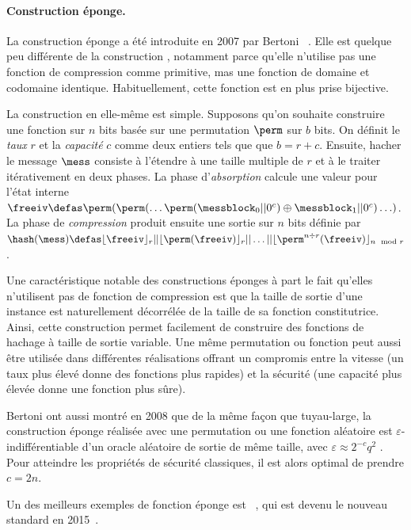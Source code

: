 \paragraph{Construction éponge.} La construction éponge a été introduite en 2007 par
Bertoni \etal~\cite{SpongeFunctions}.
Elle est quelque peu différente de la construction \merkdam, notamment parce qu'elle n'utilise pas une fonction de compression
comme primitive, mas une fonction de domaine et codomaine identique. Habituellement, cette fonction est en plus prise bijective.

La construction en elle-même est simple. Supposons qu'on souhaite construire une fonction sur $n$ bits basée sur une permutation $\perm$ sur $b$ bits.
On définit le \emph{taux} $r$ et la \emph{capacité} $c$ comme deux entiers tels que que $b = r + c$.
Ensuite, hacher le message
$\mess$ consiste à
l'étendre à une taille multiple de $r$ et à le traiter itérativement en deux phases.
La phase d'\emph{absorption} calcule une valeur pour l'état interne
$\freeiv \defas \perm(\perm(\ldots\perm(\messblock_0||0^c)\oplus\messblock_1||0^c)\ldots)$. La phase de \emph{compression} produit ensuite une sortie sur $n$ bits définie par
$\hash(\mess) \defas \lfloor\freeiv\rfloor_r||\lfloor\perm(\freeiv)\rfloor_r||\ldots||\lfloor\perm^{n \div r}(\freeiv)\rfloor_{n \mod r}$.

Une caractéristique notable des constructions éponges à part le fait qu'elles n'utilisent pas de fonction de compression est que la taille de sortie d'une instance
est naturellement décorrélée de la taille de sa fonction constitutrice. Ainsi, cette construction permet facilement de construire des fonctions de hachage à
taille de sortie
variable. Une même permutation ou fonction peut aussi être utilisée dans différentes réalisations offrant un compromis entre la vitesse
(un taux plus élevé donne des fonctions plus rapides) et la sécurité (une capacité plus élevée donne une fonction plus sûre).

Bertoni \etal ont aussi montré en 2008 que de la même façon que \merkdam tuyau-large, la construction éponge réalisée avec une permutation ou une fonction aléatoire est
$\varepsilon$-indifférentiable d'un oracle aléatoire de sortie de même taille,
avec $\varepsilon \approx 2^{-c}q^2$ \cite{DBLP:conf/eurocrypt/BertoniDPA08}. Pour atteindre les propriétés de sécurité classiques, il est alors
optimal de prendre $c = 2n$.

Un des meilleurs exemples de fonction éponge est 
\keccak~\cite{KeccakReference}, qui est devenu le nouveau standard \shathree en 2015~\cite{Nist-SHA3}. 

